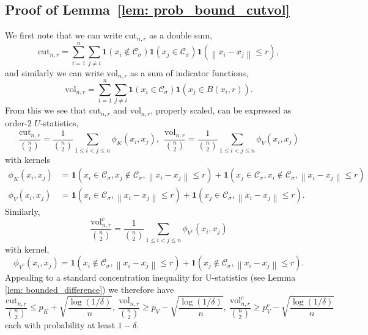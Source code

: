 \documentclass[11pt,twoside]{article}
\newcommand{\vol}{\mathrm{vol}}
\newcommand{\cut}{\mathrm{cut}}
\newcommand{\norm}[1]{\left\lVert#1\right\rVert}
\newcommand{\1}{\mathbf{1}}
\newcommand{\Cset}{\mathcal{C}}
\newcommand{\Csig}{\Cset_{\sigma}}
\begin{document}
\subsection{Proof of Lemma~\ref{lem: prob_bound_cutvol}}
We first note that we can write $\cut_{n,r}$ as a double sum,
	\begin{equation}
	\label{eqn: density_cut_expansion}
	\cut_{n,r} = \sum_{i = 1}^{n} \sum_{j \neq i} \1(x_i \not\in \Csig) \1(x_j \in \Csig) \1(\norm{x_i - x_j} \leq r),
	\end{equation}
	and similarly we can write $\vol_{n,r}$ as a sum of indicator functions,
	\begin{equation}
	\label{eqn: volume_expansion}
	\vol_{n,r} = \sum_{i = 1}^{n} \sum_{j \neq i} \1(x_i \in \Csig) \1(x_j \in B(x_i, r)).
	\end{equation}
From this we see that $\cut_{n,r}$ and $\vol_{n,r}$, properly scaled, can be expressed as order-$2$ $U$-statistics,
	\begin{equation*}
	\frac{\cut_{n,r}}{{n \choose 2}} = \frac{1}{{n \choose 2}} \sum_{1 \leq i < j \leq n} \phi_K(x_i, x_j),~~ \frac{\vol_{n,r}}{{n \choose 2}} = \frac{1}{{n \choose 2}} \sum_{1 \leq i < j \leq n} \phi_V(x_i, x_j)
	\end{equation*}
	with kernels
	\begin{align*}
	\phi_K(x_i,x_j) & = \1(x_i \in \Csig, x_j \not\in \Csig, \norm{x_i - x_j} \leq r) + \1(x_j \in \Csig, x_i \not\in \Csig, \norm{x_i - x_j} \leq r) \\
	\phi_V(x_i,x_j) & = \1(x_i \in \Csig, \norm{x_i - x_j} \leq r) + \1(x_j \in \Csig, \norm{x_i - x_j} \leq r). 
	\end{align*}
	Similarly,
	\begin{equation*}
	\frac{\vol_{n,r}^c}{{n \choose 2}} = \frac{1}{{n \choose 2}} \sum_{1 \leq i < j \leq n} \phi_{V^c}(x_i, x_j)
	\end{equation*}
	with kernel,
	\begin{equation*}
	\phi_{V^c}(x_i,x_j) = \1(x_i \not\in \Csig, \norm{x_i - x_j} \leq r) + \1(x_j \not\in \Csig, \norm{x_i - x_j} \leq r). 
	\end{equation*}
	Appealing to a standard concentration inequality for U-statistics (see Lemma \ref{lem: bounded_difference}) we therefore have
	\begin{equation*}
	\frac{\cut_{n,r}}{{n \choose 2}} \leq p_K + \sqrt{\frac{\log(1/\delta)}{n}},~  \frac{\vol_{n,r}}{{n \choose 2}} \geq p_V - \sqrt{\frac{\log(1/\delta)}{n}}, ~ \frac{\vol_{n,r}^c}{{n \choose 2}} \geq p_V^c - \sqrt{\frac{\log(1/\delta)}{n}}
	\end{equation*}
	each with probability at least $1 - \delta$. 
\end{document}
